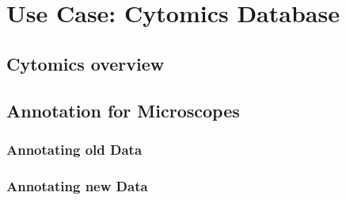 
\chapter{Use Case: Cytomics Database} %

\label{Chapter5} %



\section{Cytomics overview}


\section{Annotation for Microscopes}



\subsection{Annotating old Data}


\subsection{Annotating new Data}

